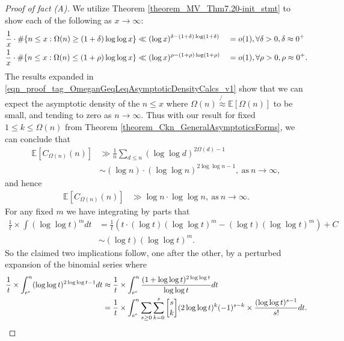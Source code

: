\documentclass[11pt,reqno,a4letter]{article}
\numberwithin{figure}{section}
\numberwithin{table}{section}
\newcommand{\gkpSI}[2]{\ensuremath{\genfrac{\lbrack}{\rbrack}{0pt}{}{#1}{#2}}}
\theoremstyle{plain}
\numberwithin{theorem}{section}
\theoremstyle{definition}
\begin{document}
\begin{proof}[Proof of fact (A)] 
We utilize Theorem \ref{theorem_MV_Thm7.20-init_stmt} 
to show each of the following as $x \rightarrow \infty$: 
\begin{align} 
\notag 
\frac{1}{x} \cdot \#\{n \leq x: \Omega(n) \geq (1+\delta) \log\log x\} & \ll (\log x)^{\delta - (1+\delta)\log(1+\delta)} 
     && = o(1), \forall \delta > 0, \delta \approx 0^{+} \\ 
\label{eqn_proof_tag_OmeganGeqLeqAsymptoticDensityCalcs_v1} 
\frac{1}{x} \cdot \#\{n \leq x: \Omega(n) \leq (1+\rho) \log\log x\} & \ll (\log x)^{\rho - (1+\rho)\log(1+\rho)} 
     && = o(1), \forall \rho > 0, \rho \approx 0^{+}.   
\end{align} 
The results expanded in 
\eqref{eqn_proof_tag_OmeganGeqLeqAsymptoticDensityCalcs_v1} show that we can expect the 
asymptotic density of the $n \leq x$ where $\Omega(n) \not{\approx} \mathbb{E}[\Omega(n)]$ to be small, 
and tending to zero as $n \rightarrow \infty$. 
Thus with our result for fixed $1 \leq k \leq \Omega(n)$ from 
Theorem \ref{theorem_Ckn_GeneralAsymptoticsForms}, 
we can conclude that 
\begin{align*} 
\mathbb{E}[C_{\Omega(n)}(n)] & \gg \frac{1}{n} \sum_{d \leq n} (\log\log d)^{2\Omega(d)-1} \\ 
     & \sim (\log n) \cdot (\log\log n)^{2\log\log n - 1}, \mathrm{\ as\ } n \rightarrow \infty, 
\end{align*} 
and hence 
\begin{align*} 
\mathbb{E}[C_{\Omega(n)}(n)] & \gg \log n \cdot \log\log n, \mathrm{\ as\ } n \rightarrow \infty. 
\end{align*} 
For any fixed $m$ we have integrating by parts that 
\begin{align*} 
\frac{1}{t} \times \int (\log\log t)^m dt & = \frac{1}{t}\left( 
     t \cdot (\log t) (\log\log t)^m - (\log t) (\log\log t)^m\right) + C \\ 
     & \sim (\log t) (\log\log t)^m. 
\end{align*} 
So the claimed two implications follow, one after the other, by a 
perturbed expansion of the binomial series where 
\begin{align*} 
\frac{1}{t} \times \int_{e^e}^{n} (\log\log t)^{2\log\log t - 1} dt & \approx 
     \frac{1}{t} \times \int_{e^e}^{n} \frac{(1 + \log\log t)^{2\log\log t}}{\log\log t} dt \\ 
     & = \frac{1}{t} \times \int_{e^e}^{n} 
     \sum_{s \geq 0} \sum_{k=0}^{s} \gkpSI{s}{k} (2\log\log t)^{k} (-1)^{s-k} \times 
     \frac{(\log\log t)^{s-1}}{s!} dt. 
     \qedhere 
\end{align*} 
\end{proof} 
\end{document}
